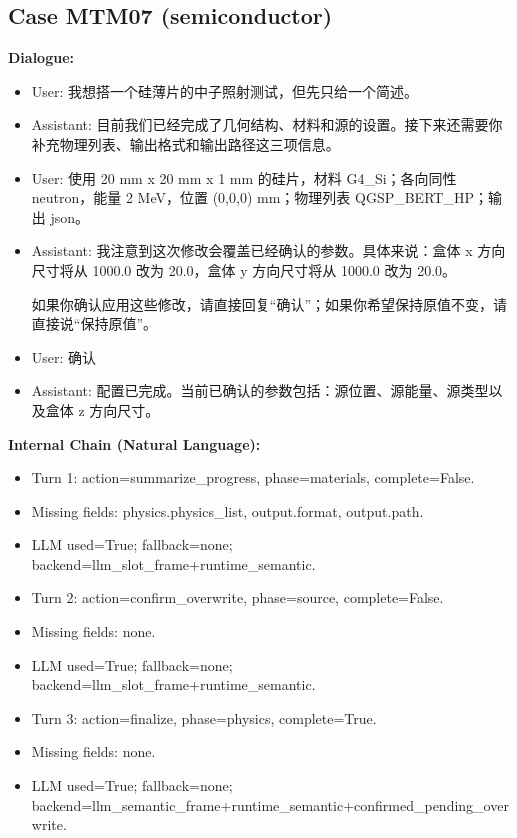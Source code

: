 \documentclass[11pt]{ctexart}
\begin{document}
\subsection{Case MTM07 (semiconductor)}
\textbf{Dialogue:}
\begin{itemize}
\item User: 我想搭一个硅薄片的中子照射测试，但先只给一个简述。
\item Assistant: 目前我们已经完成了几何结构、材料和源的设置。接下来还需要你补充物理列表、输出格式和输出路径这三项信息。
\item User: 使用 20 mm x 20 mm x 1 mm 的硅片，材料 G4\_Si；各向同性 neutron，能量 2 MeV，位置 (0,0,0) mm；物理列表 QGSP\_BERT\_HP；输出 json。
\item Assistant: 我注意到这次修改会覆盖已经确认的参数。具体来说：盒体 x 方向尺寸将从 1000.0 改为 20.0，盒体 y 方向尺寸将从 1000.0 改为 20.0。

如果你确认应用这些修改，请直接回复“确认”；如果你希望保持原值不变，请直接说“保持原值”。
\item User: 确认
\item Assistant: 配置已完成。当前已确认的参数包括：源位置、源能量、源类型以及盒体 z 方向尺寸。
\end{itemize}
\textbf{Internal Chain (Natural Language):}
\begin{itemize}
\item Turn 1: action=summarize\_progress, phase=materials, complete=False.
\item Missing fields: physics.physics\_list, output.format, output.path.
\item LLM used=True; fallback=none; backend=llm\_slot\_frame+runtime\_semantic.
\item Turn 2: action=confirm\_overwrite, phase=source, complete=False.
\item Missing fields: none.
\item LLM used=True; fallback=none; backend=llm\_slot\_frame+runtime\_semantic.
\item Turn 3: action=finalize, phase=physics, complete=True.
\item Missing fields: none.
\item LLM used=True; fallback=none; backend=llm\_semantic\_frame+runtime\_semantic+confirmed\_pending\_overwrite.
\end{itemize}
\end{document}

